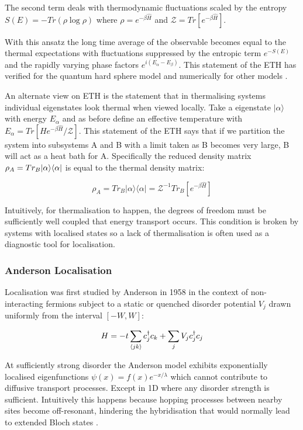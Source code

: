 The second term deals with thermodynamic fluctuations scaled by the entropy \(S(E) = -Tr(\rho \log \rho)\) where \(\rho = e^{-\beta \hat{H}}\) and \(\mathcal{Z} = Tr[e^{-\beta \hat{H}}]\).

With this ansatz the long time average of the observable becomes equal to the thermal expectations with fluctuations suppressed by the entropic term \(e^{-S(E)}\) and the rapidly varying phase factors \(e^{i(E_\alpha - E_\beta)}\). This statement of the ETH has verified for the quantum hard sphere model \autocite{srednickiChaosQuantumThermalization1994} and numerically for other models \autocite{khatamiFluctuationDissipationTheoremIsolated2013,dalessioQuantumChaosEigenstate2016}.

An alternate view on ETH is the statement that in thermalising systems individual eigenstates look thermal when viewed locally. Take a eigenstate \(|\alpha\rangle\) with energy \(E_\alpha\) and as before define an effective temperature with \(E_\alpha = Tr[H e^{-\beta \hat{H}}/\mathcal{Z}]\). This statement of the ETH says that if we partition the system into subsystems A and B with a limit taken as B becomes very large, B will act as a heat bath for A. Specifically the reduced density matrix \(\rho_A = Tr_B |\alpha\rangle \langle\alpha|\) is equal to the thermal density matrix:

\[\rho_A = Tr_B |\alpha\rangle \langle \alpha| = \mathcal{Z}^{-1} Tr_B [e^{-\beta \hat{H}}] \]

Intuitively, for thermalisation to happen, the degrees of freedom must be sufficiently well coupled that energy transport occurs. This condition is broken by systems with localised states so a lack of thermalisation is often used as a diagnostic tool for localisation.

\hypertarget{anderson-localisation}{%
\subsubsection{Anderson Localisation}\label{anderson-localisation}}

Localisation was first studied by Anderson in 1958 \textcite{andersonAbsenceDiffusionCertain1958} in the context of non-interacting fermions subject to a static or quenched disorder potential \(V_j\) drawn uniformly from the interval \([-W,W]\):

\[
H = -t\sum_{\langle jk \rangle} c^\dagger_j c_k + \sum_j V_j c_j^\dagger c_j
\]

At sufficiently strong disorder the Anderson model exhibits exponentially localised eigenfunctions \(\psi(x) = f(x) e^{-x/\lambda}\) which cannot contribute to diffusive transport processes. Except in 1D where any disorder strength is sufficient. Intuitively this happens because hopping processes between nearby sites become off-resonant, hindering the hybridisation that would normally lead to extended Bloch states \textcite{kramerLocalizationTheoryExperiment1993}.

